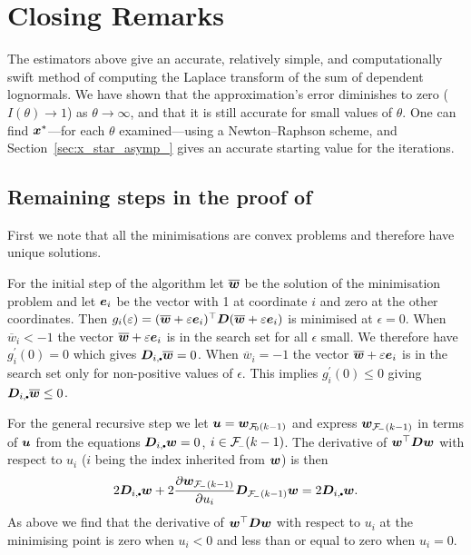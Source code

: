 \section{Closing Remarks}\label{S:Remarks}

The estimators above give an accurate, relatively simple, and computationally
swift method of computing the Laplace transform of the sum of dependent
lognormals. We have shown that the approximation's error diminishes to zero
($I(\theta) \to 1$) as $\theta \to \infty$, and that it is still accurate for
small values of $\theta$. One can find $\bm{x}^*$---for each $\theta$
examined---using a Newton--Raphson scheme, and Section~\ref{sec:x_star_asymp_}
gives an accurate starting value for the iterations.

\begin{subappendices}

\section{Remaining steps in the proof of }

First we note that all the minimisations are convex problems and therefore
have unique solutions.

For the initial step of the algorithm let $\overline {\bm{w}}$ be the solution of
the minimisation problem and let $\bm{e}_i$ be the vector with 1 at coordinate
$i$ and zero at the other coordinates. Then $g_i(\varepsilon)=(\overline
{\bm{w}}+\varepsilon \bm{e}_i)^\top\bm{D}(\overline {\bm{w}}+\varepsilon \bm{e}_i)$ is minimised at
$\epsilon=0$. When $\overline w_i<-1$ the vector $\overline {\bm{w}}+\varepsilon
\bm{e}_i$ is in the search set for all $\epsilon$ small. We therefore have
$g_i^\prime(0)=0$ which gives $\bfD_{i,\sbullet}\overline \bfw=0$.  When
$\overline w_i=-1$ the vector $\overline {\bm{w}}+\varepsilon \bm{e}_i$ is in the
search set only for non-positive values of $\epsilon$.  This implies
$g_i^\prime(0)\leq 0$ giving $\bfD_{i,\sbullet}\overline \bfw\leq 0$.

For the general recursive step we let $\bfu=\bfw_{\Fset{0}(k-1)}$ and express
$\bfw_{\Fset{-}(k-1)}$ in terms of $\bm{u}$ from the equations
$\bfD_{i,\sbullet}\bfw=0$, $i\in \Fset{-}(k-1)$. The derivative of $\bm{w}^\top
\bm{D} \bm{w}$ with respect to $u_i$ ($i$ being the index inherited from $\bm{w}$)
is then
%
$$2\bfD_{i,\sbullet}\bfw+2\frac{\partial \bfw_{\Fset{-}(k-1)}}{\partial
u_i}\bfD_{\Fset{-}(k-1)}\bfw= 2\bfD_{i,\sbullet}\bfw.$$
%
As above we find that the derivative of $\bm{w}^\top \bm{D} \bm{w}$ with respect to
$u_i$ at the minimising point is zero when $u_i<0$ and less than or equal to
zero when $u_i=0$.


\end{subappendices}
